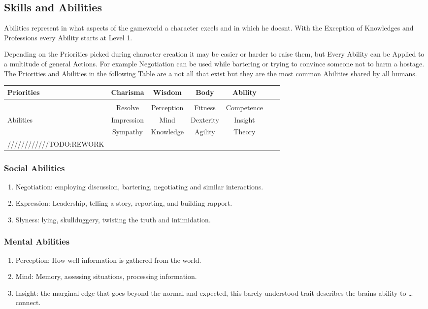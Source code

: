     \subsection{Skills and Abilities}\label{subsec:skillsAndAbilities}
    Abilities represent in what aspects of the gameworld a character excels and in which he doesnt.
    With the Exception of Knowledges and Professions every Ability starts at Level 1. \par
    Depending on the Priorities picked during character creation it may be easier or harder to raise them, but Every
    Ability can be Applied to a multitude of general Actions.
    For example Negotiation can be used while bartering or trying
    to convince someone not to harm a hostage.
    The Priorities and Abilities in the following Table are a not all that exist
    but they are the most common Abilities shared by all humans.\vspace{1cm}
    \begin{tabular}{l||cccccc}
        Priorities      &Charisma      &Wisdom         &Body        &Ability    \\\hline\\
                        &Resolve       &Perception     &Fitness     &Competence   \\
        Abilities       &Impression    &Mind           &Dexterity   &Insight   \\
                        &Sympathy      &Knowledge      &Agility     &Theory   \\


        ////////////TODO:REWORK
    \end{tabular}\vspace{1cm}
    \subsubsection{Social Abilities} 
        \begin{enumerate}[label= -]
            \item {Negotiation}: employing discussion, bartering, negotiating and similar interactions.
            \item {Expression}: Leadership, telling a story, reporting, and building rapport.
            \item {Slyness}: lying, skullduggery, twisting the truth and intimidation.
        \end{enumerate}
    \subsubsection{Mental Abilities} 
        \begin{enumerate}[label=-]
            \item {Perception}: How well information is gathered from the world.
            \item {Mind}: Memory, assessing situations, processing information.
            \item {Insight}: the marginal edge that goes beyond the normal and expected, this barely understood trait
            describes the brains ability to \ldots connect.
        \end{enumerate}
